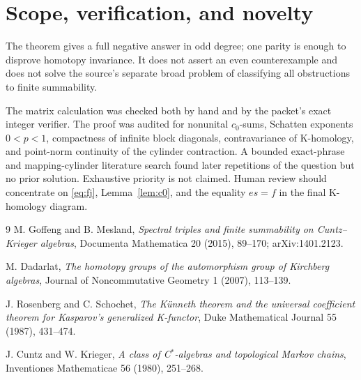 \documentclass[11pt]{article}
\begin{document}
\section{Scope, verification, and novelty}
The theorem gives a full negative answer in odd degree; one parity is enough
to disprove homotopy invariance.  It does not assert an even counterexample
and does not solve the source's separate broad problem of classifying all
obstructions to finite summability.

The matrix calculation was checked both by hand and by the packet's exact
integer verifier.  The proof was audited for nonunital $c_0$-sums,
Schatten exponents $0<p<1$, compactness of infinite block diagonals,
contravariance of K-homology, and point-norm continuity of the cylinder
contraction.  A bounded exact-phrase and mapping-cylinder literature search
found later repetitions of the question but no prior solution.  Exhaustive
priority is not claimed.  Human review should concentrate on
\eqref{eq:fj}, Lemma~\ref{lem:c0}, and the equality $es=f$ in the final
K-homology diagram.

\begin{thebibliography}{9}
M. Goffeng and B. Mesland,
\emph{Spectral triples and finite summability on Cuntz--Krieger algebras},
Documenta Mathematica 20 (2015), 89--170; arXiv:1401.2123.

M. Dadarlat,
\emph{The homotopy groups of the automorphism group of Kirchberg algebras},
Journal of Noncommutative Geometry 1 (2007), 113--139.

J. Rosenberg and C. Schochet,
\emph{The K\"unneth theorem and the universal coefficient theorem for
Kasparov's generalized K-functor},
Duke Mathematical Journal 55 (1987), 431--474.

J. Cuntz and W. Krieger,
\emph{A class of C$^*$-algebras and topological Markov chains},
Inventiones Mathematicae 56 (1980), 251--268.
\end{thebibliography}
\end{document}
